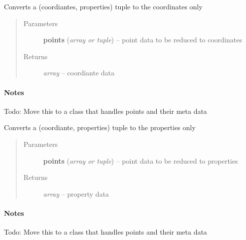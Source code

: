 \documentclass[letterpaper,10pt,english]{sphinxmanual}
\begin{document}

\begin{fulllineitems}
\label{api/ClearMap.IO:ClearMap.IO.IO.pointsToCoordinates}
Converts a (coordiantes, properties) tuple to the coordinates only
\begin{quote}\begin{description}
\item[{Parameters}] \leavevmode
\textbf{points} (\emph{array or tuple}) --
point data to be reduced to coordinates

\item[{Returns}] \leavevmode
\emph{array} --
coordiante data

\end{description}\end{quote}
\paragraph{Notes}

Todo: Move this to a class that handles points and their meta data

\end{fulllineitems}


\begin{fulllineitems}
\label{api/ClearMap.IO:ClearMap.IO.IO.pointsToProperties}
Converts a (coordiante, properties) tuple to the properties only
\begin{quote}\begin{description}
\item[{Parameters}] \leavevmode
\textbf{points} (\emph{array or tuple}) --
point data to be reduced to properties

\item[{Returns}] \leavevmode
\emph{array} --
property data

\end{description}\end{quote}
\paragraph{Notes}

Todo: Move this to a class that handles points and their meta data

\end{fulllineitems}
\end{document}

